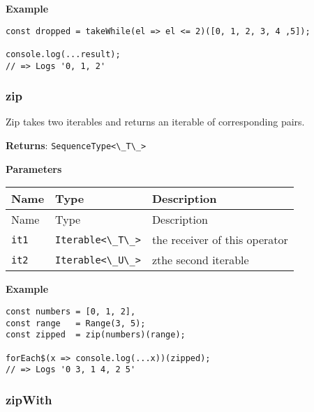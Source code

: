 \textbf{Example}

\begin{lstlisting}[label=643a92b4-09d7-4bc6-aa4b-dab46314eaa3]
const dropped = takeWhile(el => el <= 2)([0, 1, 2, 3, 4 ,5]);
                                                               
console.log(...result);
// => Logs '0, 1, 2'
\end{lstlisting}

\hypertarget{9bca8d6e-83f7-4964-87ac-3f1be94d150d}{%
\subsubsection{zip}\label{9bca8d6e-83f7-4964-87ac-3f1be94d150d}}

Zip takes two iterables and returns an iterable of corresponding pairs.

\textbf{Returns}: \passthrough{\lstinline!SequenceType<\_T\_>!}

\textbf{Parameters}

\begin{longtable}[]{
  >{\raggedright\arraybackslash}p{}
  >{\raggedright\arraybackslash}p{}
  >{\raggedright\arraybackslash}p{}@{}}

\toprule\noalign{}
Name & Type & Description \\
\midrule\noalign{}
\endfirsthead
\toprule\noalign{}
Name & Type & Description \\
\midrule\noalign{}
\endhead
\bottomrule\noalign{}
\endlastfoot
\passthrough{\lstinline!it1!} &
\passthrough{\lstinline!Iterable<\_T\_>!} & the receiver of this
operator \\
\passthrough{\lstinline!it2!} &
\passthrough{\lstinline!Iterable<\_U\_>!} & zthe second iterable \\
\end{longtable}

\textbf{Example}

\begin{lstlisting}[label=960fcdca-f1f5-465e-a398-6966c47e3f02]
const numbers = [0, 1, 2],
const range   = Range(3, 5);
const zipped  = zip(numbers)(range);
                                         
forEach$(x => console.log(...x))(zipped);
// => Logs '0 3, 1 4, 2 5'
\end{lstlisting}

\hypertarget{1a453b49-15f0-4893-ac16-295a516efc66}{%
\subsubsection{zipWith}\label{1a453b49-15f0-4893-ac16-295a516efc66}}

